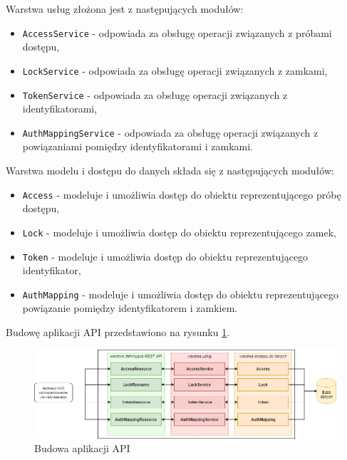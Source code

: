 \begin{itemize}
    			Warstwa usług złożona jest z następujących modułów:

    			\begin{itemize}
    				\item \texttt{AccessService} - odpowiada za obsługę operacji związanych z próbami dostępu,
    				\item \texttt{LockService} - odpowiada za obsługę operacji związanych z zamkami,
    				\item \texttt{TokenService} - odpowiada za obsługę operacji związanych z identyfikatorami,
    				\item \texttt{AuthMappingService} - odpowiada za obsługę operacji związanych z powiązaniami pomiędzy identyfikatorami i zamkami.
    			\end{itemize}

    			Warstwa modelu i dostępu do danych składa się z następujących modułów:

    			\begin{itemize}
    				\item \texttt{Access} - modeluje i umożliwia dostęp do obiektu reprezentującego próbę dostępu,
    				\item \texttt{Lock} - modeluje i umożliwia dostęp do obiektu reprezentującego zamek,
    				\item \texttt{Token} - modeluje i umożliwia dostęp do obiektu reprezentującego identyfikator,
    				\item \texttt{AuthMapping} - modeluje i umożliwia dostęp do obiektu reprezentującego powiązanie pomiędzy identyfikatorem i zamkiem.
    			\end{itemize}


    			Budowę aplikacji API przedstawiono na rysunku \ref{fig:api}.

				\begin{figure}[h!]
	            	\centering
		            \includegraphics[width=\textwidth]{chapters/images/uslugi2.png}
		            \caption{Budowa aplikacji API}
		            \label{fig:api}
		        \end{figure}

    	\end{itemize}

